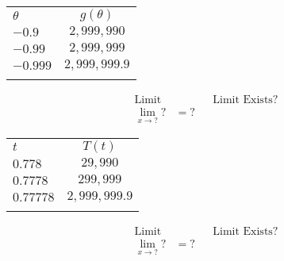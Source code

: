 \documentclass[12pt,]{book}
\theoremstyle{plain}
\theoremstyle{definition}
\theoremstyle{definition}
\theoremstyle{definition}
\theoremstyle{definition}
\theoremstyle{definition}
\numberwithin{equation}{section}
\newcommand{\hrulemedium}{\noalign{\hrule height 0.07em}}
\newcommand{\hrulethick} {\noalign{\hrule height 0.11em}}
\newcommand{\fe}[2]{#1\mathopen{}\left(#2\right)\mathclose{}}
\begin{document}
\begin{exercisegroup}
\begin{tabular}{lc}
\(\theta\)&\(\fe{g}{\theta}\)\tabularnewline\hrulemedium
\(-0.9\)&\(2{,}999{,}990\)\tabularnewline[0pt]
\(-0.99\)&\(2{,}999{,}999\)\tabularnewline[0pt]
\(-0.999\)&\(2{,}999{,}999.9\)\tabularnewline\hrulethick
\end{tabular}
\begin{align*}
\text{Limit}&&&\text{Limit Exists?}\\
\lim\limits_{x\to\mathord{?}}\mathord{?}&=\mathord{?}
\end{align*}%
\exercise[5.]\hypertarget{exercise-limits-supplement-last}{}\begin{tabular}{lc}\hrulethick
\(t\)&\(\fe{T}{t}\)\tabularnewline\hrulemedium
\(0.778\)&\(29{,}990\)\tabularnewline[0pt]
\(0.7778\)&\(299{,}999\)\tabularnewline[0pt]
\(0.77778\)&\(2{,}999{,}999.9\)\tabularnewline\hrulethick
\end{tabular}
\begin{align*}
\text{Limit}&&&\text{Limit Exists?}\\
\lim\limits_{x\to\mathord{?}}\mathord{?}&=\mathord{?}
\end{align*}%
\end{exercisegroup}
\par\smallskip\noindent
\end{document}
